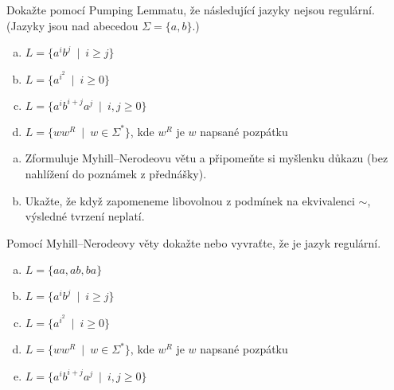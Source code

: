 \documentclass[a4paper,12pt]{amsart}
\begin{document}
\medskip\begin{problem}

    Dokažte pomocí Pumping Lemmatu, že následující jazyky nejsou regulární. (Jazyky jsou nad abecedou $\Sigma=\{a,b\}$.)

    \medskip
      
    \begin{enumerate}[(a)]\setlength\itemsep{6pt}        
        \item $L=\{a^ib^j\ \mid\ i\geq j\}$       
        \item $L=\{a^{i^2}\ \mid\ i\geq 0\}$        
        \item $L=\{a^ib^{i+j}a^j\ \mid\ i,j\geq 0\}$
        \item $L=\{ww^R\ \mid \ w\in\Sigma^*\}$, kde $w^R$ je  $w$ napsané pozpátku
    \end{enumerate}
  
\end{problem}


\medskip\begin{problem}
    
    \begin{enumerate}[(a)]
        \item Zformuluje Myhill--Nerodeovu větu a připomeňte si myšlenku důkazu (bez nahlížení do poznámek z přednášky).
        \item Ukažte, že když zapomeneme libovolnou z podmínek na ekvivalenci $\sim$, výsledné tvrzení neplatí. 
    \end{enumerate}    

\end{problem}


\medskip\begin{problem}

    Pomocí Myhill--Nerodeovy věty dokažte nebo vyvraťte, že je jazyk regulární.

    \begin{enumerate}[(a)]\setlength\itemsep{6pt}
        \item $L=\{aa, ab, ba\}$        
        \item $L=\{a^ib^j\ \mid\ i\geq j\}$        
        \item $L=\{a^{i^2}\ \mid\ i\geq 0\}$ 
        \item $L=\{ww^R\ \mid \ w\in\Sigma^*\}$, kde $w^R$ je  $w$ napsané pozpátku
        \item $L=\{a^ib^{i+j}a^j\ \mid\ i,j\geq 0\}$        
    \end{enumerate}

\end{problem}
\end{document}
